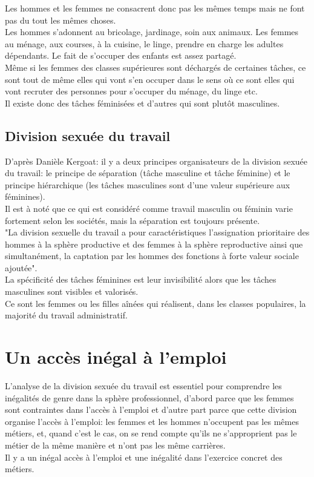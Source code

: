 \documentclass[12pt, a4paper, openany]{book}
\begin{document}
Les hommes et les femmes ne consacrent donc pas les mêmes temps mais ne font pas du tout les mêmes choses. \\
Les hommes s'adonnent au bricolage, jardinage, soin aux animaux. Les femmes au ménage, aux courses, à la cuisine, le linge, prendre en charge les adultes dépendants. Le fait de s'occuper des enfants est assez partagé. \\
Même si les femmes des classes supérieures sont déchargés de certaines tâches, ce sont tout de même elles qui vont s'en occuper dans le sens où ce sont elles qui vont recruter des personnes pour s'occuper du ménage, du linge etc. \\
Il existe donc des tâches féminisées et d'autres qui sont plutôt masculines. 

\subsection{Division sexuée du travail}


D'après Danièle Kergoat: il y a deux principes  organisateurs de la division sexuée du travail: le principe de séparation (tâche masculine et tâche féminine) et le principe hiérarchique (les tâches masculines sont d'une valeur supérieure aux féminines). \\
Il est à noté que ce qui est considéré comme travail masculin ou féminin varie fortement selon les sociétés, mais la séparation est toujours présente. \\
"La division sexuelle du travail a pour caractéristiques l'assignation prioritaire des hommes à la sphère productive et des femmes à la sphère reproductive ainsi que simultanément, la captation par les hommes des fonctions à forte valeur sociale ajoutée". \\
La spécificité des tâches féminines est leur invisibilité alors que les tâches masculines sont visibles et valorisés. \\
Ce sont les femmes ou les filles aînées qui réalisent, dans les classes populaires, la majorité du travail administratif.


\section{Un accès inégal à l'emploi}

L'analyse de la division sexuée du travail est essentiel pour comprendre les inégalités de genre dans la sphère professionnel, d'abord parce que les femmes sont contraintes dans l'accès à l'emploi et d'autre part parce que cette division organise l'accès à l'emploi: les femmes et les hommes n'occupent pas les mêmes métiers, et, quand c'est le cas, on se rend compte qu'ils ne s'approprient pas le métier de la même manière et n'ont pas les même carrières. \\
Il y a un inégal accès à l'emploi et une inégalité dans l'exercice concret des métiers. 
\end{document}
